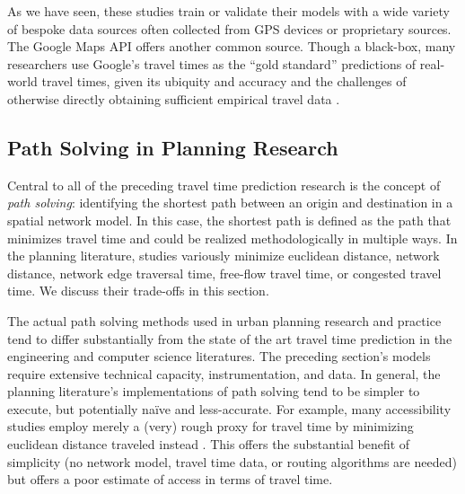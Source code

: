 \documentclass[12pt,letterpaper]{article} %
\begin{document}
As we have seen, these studies train or validate their models with a wide variety of bespoke data sources often collected from GPS devices or proprietary sources. The Google Maps API offers another common source. Though a black-box, many researchers use Google's travel times as the \enquote{gold standard} predictions of real-world travel times, given its ubiquity and accuracy and the challenges of otherwise directly obtaining sufficient empirical travel data \citep[e.g.,][]{goudarzi2018travel,stanojevic2019mapreuse,ludwig2023traffic}.

\subsection{Path Solving in Planning Research}

Central to all of the preceding travel time prediction research is the concept of \textit{path solving}: identifying the shortest path between an origin and destination in a spatial network model. In this case, the shortest path is defined as the path that minimizes travel time and could be realized methodologically in multiple ways. In the planning literature, studies variously minimize euclidean distance, network distance, network edge traversal time, free-flow travel time, or congested travel time. We discuss their trade-offs in this section.

The actual path solving methods used in urban planning research and practice tend to differ substantially from the state of the art travel time prediction in the engineering and computer science literatures. The preceding section's models require extensive technical capacity, instrumentation, and data. In general, the planning literature's implementations of path solving tend to be simpler to execute, but potentially naïve and less-accurate. For example, many accessibility studies employ merely a (very) rough proxy for travel time by minimizing euclidean distance traveled instead \citep[e.g.,][]{macfarlane2021modeling,pearsall2020locating}. This offers the substantial benefit of simplicity (no network model, travel time data, or routing algorithms are needed) but offers a poor estimate of access in terms of travel time.
\end{document}
